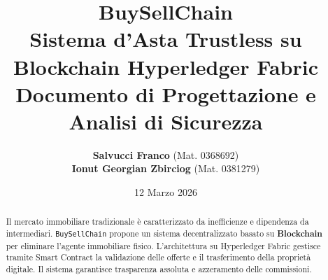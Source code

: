 \documentclass[12pt, a4paper]{report}
\title{
    \vspace{2cm}
    {\Huge\bfseries BuySellChain}\\
    \vspace{0.5cm}
    {\Large Sistema d'Asta Trustless su Blockchain Hyperledger Fabric}\\
    \vspace{1cm}
    {\small Documento di Progettazione e Analisi di Sicurezza }
}
\author{
    \textbf{Salvucci Franco} (Mat. 0368692) \\
    \textbf{Ionut Georgian Zbirciog} (Mat. 0381279)
}
\date{12 Marzo 2026}
\begin{document}
\maketitle

\cleardoublepage
\begin{abstract}
    Il mercato immobiliare tradizionale è caratterizzato da inefficienze e dipendenza da intermediari. 
    \texttt{BuySellChain} propone un sistema decentralizzato basato su \textbf{Blockchain} per eliminare l'agente immobiliare fisico. 
    L'architettura su Hyperledger Fabric gestisce tramite Smart Contract la validazione delle offerte e il trasferimento della proprietà digitale. 
    Il sistema garantisce trasparenza assoluta e azzeramento delle commissioni.
\end{abstract}

\cleardoublepage
\tableofcontents

\cleardoublepage







\nocite{*}

 
\end{document}
